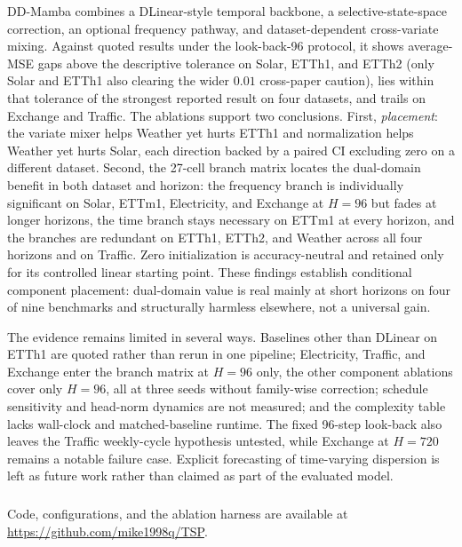 \documentclass[runningheads]{llncs}
\newcommand{\model}{DD-Mamba}
\newif\ifanonymous
\begin{document}
\model{} combines a DLinear-style temporal backbone, a selective-state-space
correction, an optional frequency pathway, and dataset-dependent
cross-variate mixing. Against quoted results under the look-back-96 protocol,
it shows average-MSE gaps above the descriptive tolerance on Solar, ETTh1,
and ETTh2 (only Solar and ETTh1 also clearing the wider $0.01$ cross-paper
caution), lies within that tolerance of the strongest reported result on four
datasets, and trails on Exchange and Traffic. The ablations support two
conclusions. First, \emph{placement}: the variate mixer helps Weather yet
hurts ETTh1 and normalization helps Weather yet hurts Solar, each direction
backed by a paired CI excluding zero on a different dataset. Second, the
27-cell branch matrix locates the dual-domain benefit in both dataset and
horizon: the frequency branch is individually significant on Solar, ETTm1,
Electricity, and Exchange at $H{=}96$ but fades at longer horizons, the
time branch stays necessary on ETTm1 at every horizon, and the branches are
redundant on ETTh1, ETTh2, and Weather across all four horizons and on
Traffic. Zero initialization is accuracy-neutral and retained only for its
controlled linear starting point. These findings establish conditional
component placement: dual-domain value is real mainly at short horizons on
four of nine benchmarks and structurally harmless elsewhere, not a
universal gain.

The evidence remains limited in several ways. Baselines other than DLinear on
ETTh1 are quoted rather than rerun in one pipeline; Electricity, Traffic, and
Exchange enter the branch matrix at $H{=}96$ only, the other component
ablations cover only $H{=}96$, all at three seeds without family-wise
correction; schedule sensitivity and head-norm dynamics are not measured; and
the complexity table lacks wall-clock and matched-baseline runtime. The fixed
96-step look-back also leaves the Traffic weekly-cycle hypothesis untested,
while Exchange at $H{=}720$ remains a notable failure case. Explicit
forecasting of time-varying dispersion is left as future work rather than
claimed as part of the evaluated model.

\ifanonymous
\paragraph{Reproducibility.} Code, configurations, and the ablation harness
are supplementary material, to be released publicly upon acceptance.
\else
\subsubsection{\ackname}
Code, configurations, and the ablation harness are available at
\url{https://github.com/mike1998q/TSP}.
\fi
\end{document}
